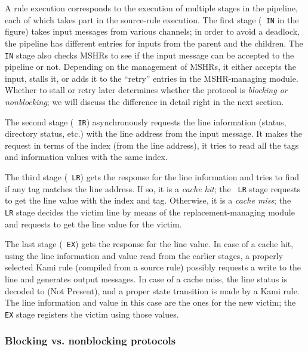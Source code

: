 A \hemiola{} rule execution corresponds to the execution of multiple stages in the pipeline, each of which takes part in the source-rule execution.
The first stage ({\small\tt\color{myblue} IN} in the figure) takes input messages from various channels; in order to avoid a deadlock, the pipeline has different entries for inputs from the parent and the children.
The {\small\tt\color{myblue} IN} stage also checks MSHRs to see if the input message can be accepted to the pipeline or not.
Depending on the management of MSHRs, it either accepts the input, stalls it, or adds it to the ``retry'' entries in the MSHR-managing module.
Whether to stall or retry later determines whether the protocol is \emph{blocking or nonblocking}; we will discuss the difference in detail right in the next section.

The second stage ({\small\tt\color{myblue} IR}) asynchronously requests the line information (status, directory status, etc.) with the line address from the input message.
It makes the request in terms of the index (from the line address), \ie{} it tries to read all the tags and information values with the same index.

The third stage ({\small\tt\color{myblue} LR}) gets the response for the line information and tries to find if any tag matches the line address.
If so, it is a \emph{cache hit}; the {\small\tt\color{myblue} LR} stage requests to get the line value with the index and tag.
Otherwise, it is a \emph{cache miss}; the {\small\tt\color{myblue} LR} stage decides the victim line by means of the replacement-managing module and requests to get the line value for the victim.

The last stage ({\small\tt\color{myblue} EX}) gets the response for the line value.
In case of a cache hit, using the line information and value read from the earlier stages, a properly selected Kami rule (compiled from a source \hemiola{} rule) possibly requests a write to the line and generates output messages.
In case of a cache miss, the line status is decoded to \stNP{} (Not Present), and a proper state transition is made by a Kami rule.
The line information and value in this case are the ones for the new victim; the {\small\tt\color{myblue} EX} stage registers the victim using those values.

\subsubsection{Blocking vs. nonblocking protocols}

